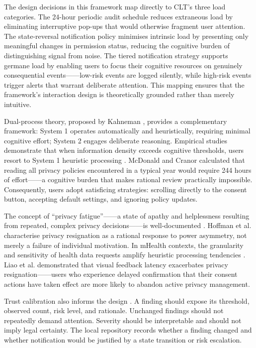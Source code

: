 The design decisions in this framework map directly to CLT's three load categories. The 24-hour periodic audit schedule reduces extraneous load by eliminating interruptive pop-ups that would otherwise fragment user attention. The state-reversal notification policy minimises intrinsic load by presenting only meaningful changes in permission status, reducing the cognitive burden of distinguishing signal from noise. The tiered notification strategy supports germane load by enabling users to focus their cognitive resources on genuinely consequential events——low-risk events are logged silently, while high-risk events trigger alerts that warrant deliberate attention. This mapping ensures that the framework's interaction design is theoretically grounded rather than merely intuitive.

Dual-process theory, proposed by Kahneman \cite{22}, provides a complementary framework: System 1 operates automatically and heuristically, requiring minimal cognitive effort; System 2 engages deliberate reasoning. Empirical studies demonstrate that when information density exceeds cognitive thresholds, users resort to System 1 heuristic processing \cite{12,13}. McDonald and Cranor \cite{12} calculated that reading all privacy policies encountered in a typical year would require 244 hours of effort——a cognitive burden that makes rational review practically impossible. Consequently, users adopt satisficing strategies: scrolling directly to the consent button, accepting default settings, and ignoring policy updates.

The concept of ``privacy fatigue''——a state of apathy and helplessness resulting from repeated, complex privacy decisions——is well-documented \cite{10}. Hoffman et al. \cite{10} characterise privacy resignation as a rational response to power asymmetry, not merely a failure of individual motivation. In mHealth contexts, the granularity and sensitivity of health data requests amplify heuristic processing tendencies \cite{14}. Liao et al. \cite{14} demonstrated that visual feedback latency exacerbates privacy resignation——users who experience delayed confirmation that their consent actions have taken effect are more likely to abandon active privacy management.

Trust calibration also informs the design \cite{34}. A finding should expose its threshold, observed count, risk level, and rationale. Unchanged findings should not repeatedly demand attention. Severity should be interpretable and should not imply legal certainty. The local repository records whether a finding changed and whether notification would be justified by a state transition or risk escalation.

